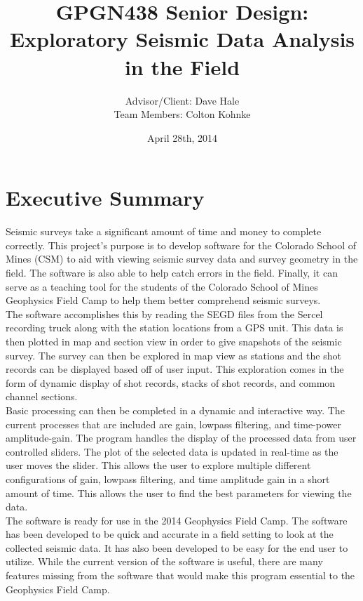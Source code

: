 \documentclass[12pt]{article}
\author{Advisor/Client: Dave Hale \\ Team Members: Colton Kohnke}
\title{GPGN438 Senior Design: \\ Exploratory Seismic Data Analysis in the Field}
\date{April 28th, 2014}
\begin{document}
\maketitle
\newpage

\section{Executive Summary}

Seismic surveys take a significant amount of time and money to complete correctly. This project's purpose is to develop software for the Colorado School of Mines (CSM) to aid with viewing seismic survey data and survey geometry in the field. The software is also able to help catch errors in the field. Finally, it can serve as a teaching tool for the students of the Colorado School of Mines Geophysics Field Camp to help them better comprehend seismic surveys. \\

The software accomplishes this by reading the SEGD files from the Sercel recording truck along with the station locations from a GPS unit. This data is then plotted in map and section view in order to give snapshots of the seismic survey. The survey can then be explored in map view as stations and the shot records can be displayed based off of user input. This exploration comes in the form of dynamic display of shot records, stacks of shot records, and common channel sections.\\

Basic processing can then be completed in a dynamic and interactive way. The current processes that are included are gain, lowpass filtering, and time-power amplitude-gain. The program handles the display of the processed data from user controlled sliders. The plot of the selected data is updated in real-time as the user moves the slider. This allows the user to explore multiple different configurations of gain, lowpass filtering, and time amplitude gain in a short amount of time. This allows the user to find the best parameters for viewing the data.\\

The software is ready for use in the 2014 Geophysics Field Camp. The software has been developed to be quick and accurate in a field setting to look at the collected seismic data. It has also been developed to be easy for the end user to utilize. While the current version of the software is useful, there are many features missing from the software that would make this program essential to the Geophysics Field Camp. 
\end{document}
